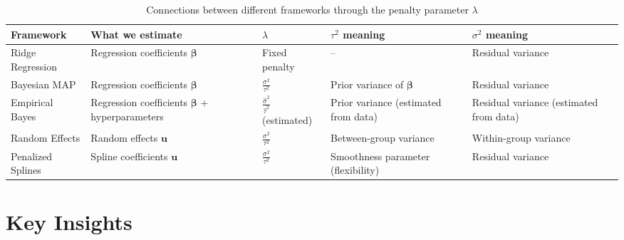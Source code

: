 \documentclass[11pt]{article}
\begin{document}
\begin{table}[h]
\centering
\begin{tabular}{@{}p{2.5cm}p{2.8cm}p{2.2cm}p{2.5cm}p{2.5cm}@{}}
\toprule
\textbf{Framework} & \textbf{What we estimate} & \textbf{$\lambda$} & \textbf{$\tau^2$ meaning} & \textbf{$\sigma^2$ meaning} \\
\midrule
Ridge Regression & Regression coefficients $\boldsymbol{\beta}$ & Fixed penalty & -- & Residual variance \\
\midrule
Bayesian MAP & Regression coefficients $\boldsymbol{\beta}$ & $\frac{\sigma^2}{\tau^2}$ & Prior variance of $\boldsymbol{\beta}$ & Residual variance \\
\midrule
Empirical Bayes & Regression coefficients $\boldsymbol{\beta}$ + hyperparameters & $\frac{\hat{\sigma}^2}{\hat{\tau}^2}$ (estimated) & Prior variance (estimated from data) & Residual variance (estimated from data) \\
\midrule
Random Effects & Random effects $\mathbf{u}$ & $\frac{\sigma^2}{\tau^2}$ & Between-group variance & Within-group variance \\
\midrule
Penalized Splines & Spline coefficients $\mathbf{u}$ & $\frac{\sigma^2}{\tau^2}$ & Smoothness parameter (flexibility) & Residual variance \\
\bottomrule
\end{tabular}
\caption{Connections between different frameworks through the penalty parameter $\lambda$}
\end{table}

\section{Key Insights}
\end{document}

